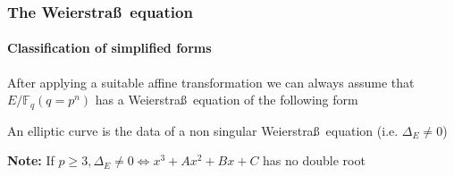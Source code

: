 \documentclass[10pt,handout]{beamer} %
\newcommand{\F}{\mathbb F}
\theoremstyle{definition}
\begin{document}
\begin{frame}
\frametitle{The Weierstra\ss\ equation}
\framesubtitle{Classification of simplified forms}

After applying a suitable affine transformation we can always assume that $E/\F_q (q=p^n)$
has a Weierstra\ss\ equation of the following form\pause

\begin{scriptsize}
\end{scriptsize}\pause

\begin{definition} An elliptic curve is the data of a non
singular Weierstra\ss\ equation (i.e. $\Delta_E\neq0$)
\end{definition}\pause

\centerline{\alert{\textbf{Note:} If $p\ge3, \Delta_E\neq0\Leftrightarrow x^3+Ax^2+Bx+C$ has {no} double root}}
\end{frame}
\end{document}
